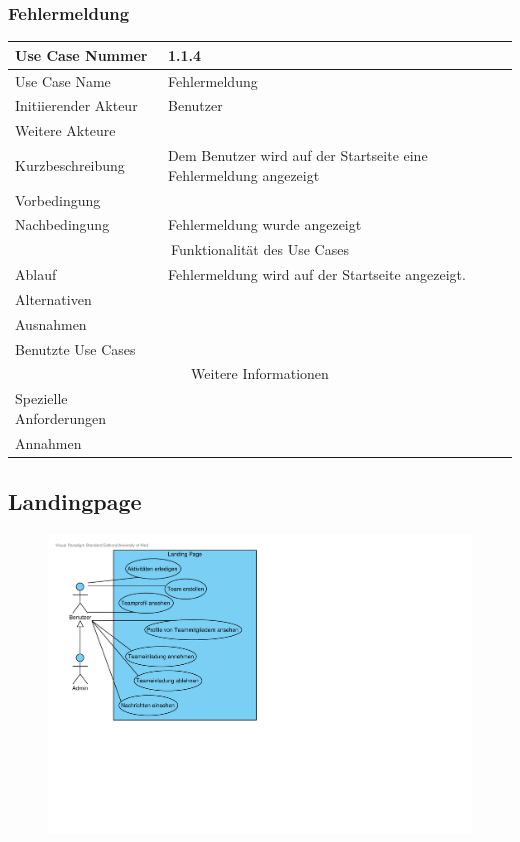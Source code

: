 \documentclass[10pt,a4paper]{article}
\begin{document}
\subsubsection{Fehlermeldung} %
	\begin{tabular}{|l|p{.5\linewidth}|}
	\hline Use Case Nummer & 1.1.4 \\ 
	\hline Use Case Name & Fehlermeldung \\ 
	\hline Initiierender Akteur & Benutzer \\
	\hline Weitere Akteure &  \\
	\hline Kurzbeschreibung & Dem Benutzer wird auf der Startseite eine Fehlermeldung angezeigt \\
	\hline Vorbedingung &  \\
	\hline Nachbedingung & Fehlermeldung wurde angezeigt \\
	\hline \multicolumn{2}{|c|}{Funktionalität des Use Cases}\\
	\hline Ablauf & Fehlermeldung wird auf der Startseite angezeigt. \\
	\hline Alternativen &  \\
	\hline Ausnahmen &  \\
	\hline Benutzte Use Cases &  \\
	\hline \multicolumn{2}{|c|}{Weitere Informationen} \\
	\hline Spezielle Anforderungen &  \\
	\hline Annahmen &  \\
	\hline
	\end{tabular}
                
\subsection{Landingpage}

		\begin{figure}[h!]
			\includegraphics[width=\linewidth]{gfx/webseite/LandingPage.pdf}
		\end{figure}
\end{document}
